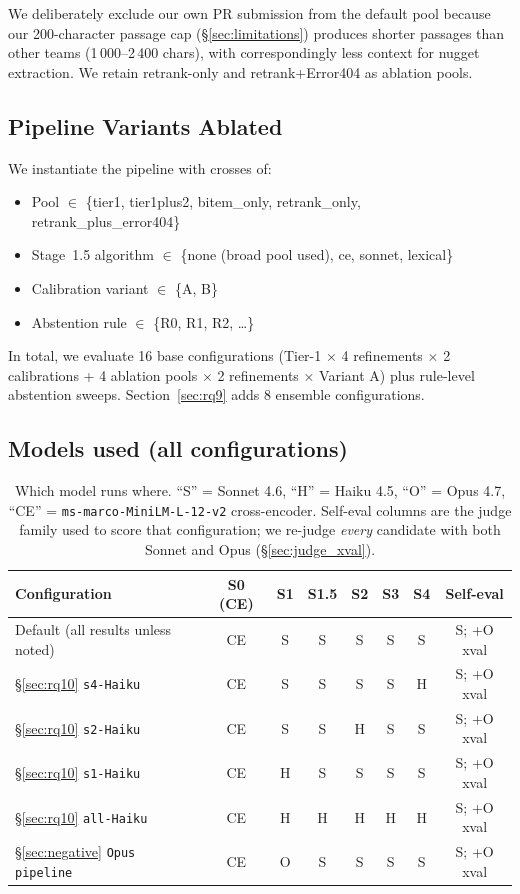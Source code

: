 \documentclass[11pt,a4paper]{article}
\begin{document}
We deliberately exclude our own PR submission from the default pool
because our 200-character passage cap (\S\ref{sec:limitations})
produces shorter passages than other teams (1\,000–2\,400 chars), with
correspondingly less context for nugget extraction. We retain
retrank-only and retrank+Error404 as ablation pools.

\subsection{Pipeline Variants Ablated}

We instantiate the pipeline with crosses of:
\begin{itemize}
  \item Pool $\in$ \{tier1, tier1plus2, bitem\_only, retrank\_only,
    retrank\_plus\_error404\}
  \item Stage~1.5 algorithm $\in$ \{none (broad pool used), ce, sonnet,
    lexical\}
  \item Calibration variant $\in$ \{A, B\}
  \item Abstention rule $\in$ \{R0, R1, R2, …\}
\end{itemize}

In total, we evaluate 16 base configurations (Tier-1 $\times$ 4
refinements $\times$ 2 calibrations + 4 ablation pools $\times$ 2
refinements $\times$ Variant A) plus rule-level abstention sweeps.
Section~\ref{sec:rq9} adds 8 ensemble configurations.

\subsection{Models used (all configurations)}

\begin{table}[h]
\centering
\caption{Which model runs where. ``S'' = Sonnet 4.6, ``H'' = Haiku
4.5, ``O'' = Opus 4.7, ``CE'' = \texttt{ms-marco-MiniLM-L-12-v2}
cross-encoder. Self-eval columns are the judge family used to
score that configuration; we re-judge \emph{every} candidate with
both Sonnet and Opus (\S\ref{sec:judge_xval}).}
\label{tab:models}
\small
\begin{tabular}{lccccccc}
\toprule
Configuration & S0 (CE) & S1 & S1.5 & S2 & S3 & S4 & Self-eval \\
\midrule
Default (all results unless noted) & CE & S & S & S & S & S & S; +O xval \\
\S\ref{sec:rq10} \texttt{s4-Haiku}     & CE & S & S & S & S & H & S; +O xval \\
\S\ref{sec:rq10} \texttt{s2-Haiku}     & CE & S & S & H & S & S & S; +O xval \\
\S\ref{sec:rq10} \texttt{s1-Haiku}     & CE & H & S & S & S & S & S; +O xval \\
\S\ref{sec:rq10} \texttt{all-Haiku}    & CE & H & H & H & H & H & S; +O xval \\
\S\ref{sec:negative} \texttt{Opus pipeline} & CE & O & S & S & S & S & S; +O xval \\
\bottomrule
\end{tabular}
\end{table}
\end{document}
